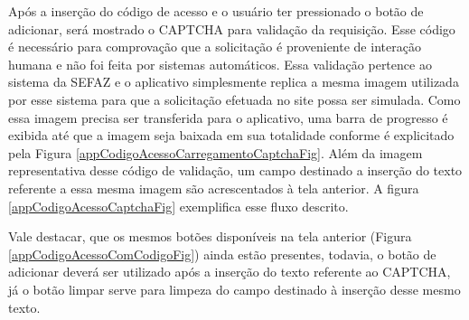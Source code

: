 \newpage
Após a inserção do código de acesso e o usuário ter pressionado o botão de adicionar, será mostrado o CAPTCHA para validação da requisição. Esse código é necessário para comprovação que a solicitação é proveniente de interação humana e não foi feita por sistemas automáticos. Essa validação pertence ao sistema da SEFAZ e o aplicativo simplesmente replica a mesma imagem utilizada por esse sistema para que a solicitação efetuada no site possa ser simulada. Como essa imagem precisa ser transferida para o aplicativo, uma barra de progresso é exibida até que a imagem seja baixada em sua totalidade conforme é explicitado pela Figura \ref{appCodigoAcessoCarregamentoCaptchaFig}. Além da imagem representativa desse código de validação, um campo destinado a inserção do texto referente a essa mesma imagem são acrescentados à tela anterior. A figura \ref{appCodigoAcessoCaptchaFig} exemplifica esse fluxo descrito.

Vale destacar, que os mesmos botões disponíveis na tela anterior (Figura \ref{appCodigoAcessoComCodigoFig}) ainda estão presentes, todavia, o botão de adicionar deverá ser utilizado após a inserção do texto referente ao CAPTCHA, já o botão limpar serve para limpeza do campo destinado à inserção desse mesmo texto.

